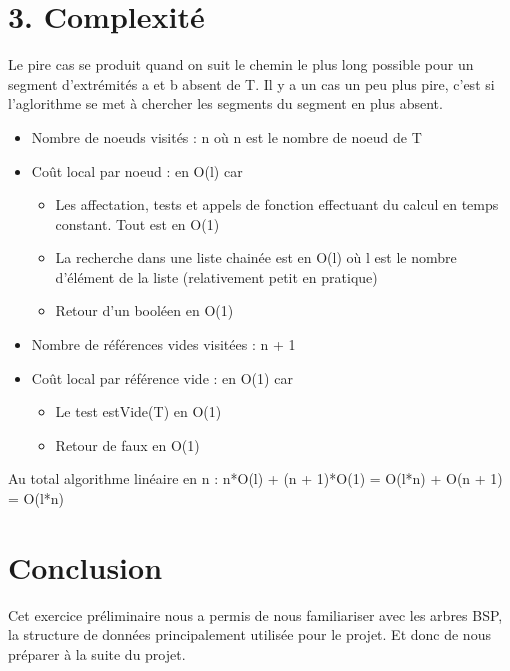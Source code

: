 \documentclass[a4paper,12pt]{report}	%
\renewcommand{\appendixpagename}{Annexes}	%
\begin{document}
\newpage

	{\section*{3. Complexité}}
	
\noindent Le pire cas se produit quand on suit le chemin le plus long possible pour un segment d'extrémités a et b absent de T. Il y a un cas un peu plus pire, c'est si l'aglorithme se met à chercher les segments du segment en plus absent.
\begin{itemize}
\item Nombre de noeuds visités : n où n est le nombre de noeud de T
\item Coût local par noeud : en O(l) car
\begin{itemize}
\item Les affectation, tests et appels de fonction effectuant du calcul en temps constant. Tout est en O(1)
\item La recherche dans une liste chainée est en O(l) où l est le nombre d'élément de la liste (relativement petit en pratique)
\item Retour d'un booléen en O(1)
\end{itemize}
\item Nombre de références vides visitées : n + 1
\item Coût local par référence vide : en O(1) car
\begin{itemize}
\item Le test estVide(T) en O(1)
\item Retour de faux en O(1)
\end{itemize}
\end{itemize}
Au total algorithme linéaire en n : n*O(l) + (n + 1)*O(1) = O(l*n) + O(n + 1) = O(l*n)
			
	{\section*{Conclusion}}
	
\noindent Cet exercice préliminaire nous a permis de nous familiariser avec les arbres BSP, la structure de données principalement utilisée pour le projet. Et donc de nous préparer à la suite du projet.

	
	
\end{document}
